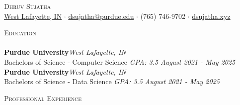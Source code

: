 \documentclass[a4paper]{article}
\newcommand{\lineunder} {
    \vspace*{-8pt} \\
    \hspace*{-18pt} \hrulefill \\
}
\newcommand{\header} [1] {
    {\hspace*{-18pt}\vspace*{6pt} \textsc{#1}}
    \vspace*{-6pt} \lineunder
}
\begin{document}
\vspace*{-40pt}

    

\vspace*{-10pt}
\begin{center}
	{\Huge \scshape {Dhruv Sujatha}}\\
	\href{https://www.google.com/maps/place/West+Lafayette,+IN/}{West Lafayette, IN} $\cdot$ \href{mailto:dsujatha@purdue.edu}{dsujatha@purdue.edu} $\cdot$ (765) 746-9702 $\cdot$ \href{https://dsujatha.xyz}{dsujatha.xyz}\\
\end{center}

\header{Education}
\textbf{Purdue University}\hfill \textit {West Lafayette, IN}\\
Bachelor\textquotesingle{}s of Science - Computer Science \textit{GPA: 3.5} \hfill \textit {August 2021 - May 2025}\\
\vspace{2mm}
\textbf{Purdue University}\hfill \textit {West Lafayette, IN}\\
Bachelor\textquotesingle{}s of Science - Data Science \textit{GPA: 3.5} \hfill \textit {August 2021 - May 2025}\\
\vspace{2mm}

\header{Professional Experience}
\vspace{1mm}
\end{document}
